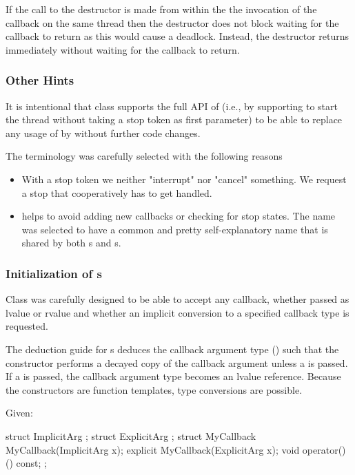 If the call to the  destructor is made from within the the
invocation of the callback on the same thread then the destructor does not block
waiting for the callback to return as this would cause a deadlock. Instead,
the destructor returns immediately without waiting for the callback to return.

\subsubsection*{Other Hints}

It is intentional that class  supports the full API of 
(i.e., by supporting to start the thread without taking a stop token as first parameter)
to be able to replace any usage of  by 
without further code changes.

The terminology was carefully selected with the following reasons
\begin{itemize}
 \item With a stop token we neither "interrupt" nor "cancel" something.
        We request a stop that cooperatively has to get handled.
 \item {} helps to avoid adding new callbacks
        or checking for stop states.
        The name was selected to have a common and pretty self-explanatory name
        that is shared by both s and s.
\end{itemize}

\subsubsection*{Initialization of s}

Class  was carefully designed to be able to accept any callback,
whether passed as lvalue or rvalue and whether an implicit conversion
to a specified callback type is requested.

The deduction guide for s deduces the callback argument type
()
such that the constructor performs a decayed copy of the callback argument
unless a  is passed.
If a  is passed,
the callback argument type becomes an lvalue reference.
Because the constructors are function templates,
type conversions are possible.

Given:
\begin{codeblock}
struct ImplicitArg {
};
struct ExplicitArg {
};
struct MyCallback {
  MyCallback(ImplicitArg x);
  explicit MyCallback(ExplicitArg x);
  void operator()() const;
};
\end{codeblock}

